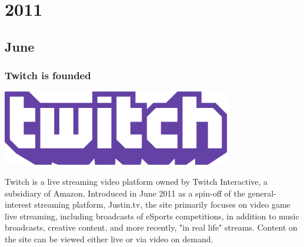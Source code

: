 \documentclass[11pt]{report}
\begin{document}
\chapter{2011}

\section{June}
\subsection{Twitch is founded}
\vspace{2mm}\begin{center}\includegraphics[width=10cm]{./img/twitch.png}\end{center}
Twitch is a live streaming video platform owned by Twitch Interactive, a subsidiary of Amazon. Introduced in June 2011 as a spin-off of the general-interest streaming platform, Justin.tv, the site primarily focuses on video game live streaming, including broadcasts of eSports competitions, in addition to music broadcasts, creative content, and more recently, "in real life" streams. Content on the site can be viewed either live or via video on demand.
\end{document}
